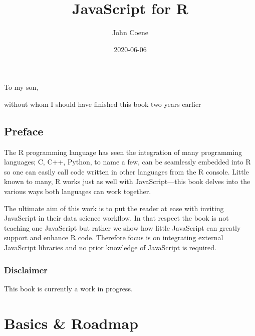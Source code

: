 \documentclass[
]{krantz}
\title{JavaScript for R}
\author{John Coene}
\date{2020-06-06}
\begin{document}
\maketitle


\thispagestyle{empty}

\begin{center}
To my son,

without whom I should have finished this book two years earlier
\end{center}

\setlength{\abovedisplayskip}{-5pt}
\setlength{\abovedisplayshortskip}{-5pt}

{
\hypersetup{linkcolor=}
\setcounter{tocdepth}{2}
\tableofcontents
}
\listoftables
\listoffigures
\hypertarget{preface}{%
\chapter*{Preface}\label{preface}}


The R programming language has seen the integration of many programming languages; C, C++, Python, to name a few, can be seamlessly embedded into R so one can easily call code written in other languages from the R console. Little known to many, R works just as well with JavaScript---this book delves into the various ways both languages can work together.

The ultimate aim of this work is to put the reader at ease with inviting JavaScript in their data science workflow. In that respect the book is not teaching one JavaScript but rather we show how little JavaScript can greatly support and enhance R code. Therefore focus is on integrating external JavaScript libraries and no prior knowledge of JavaScript is required.

\hypertarget{disclaimer}{%
\section*{Disclaimer}\label{disclaimer}}


This book is currently a work in progress.

\mainmatter

\hypertarget{part-basics-roadmap}{%
\part{Basics \& Roadmap}\label{part-basics-roadmap}}
\end{document}
